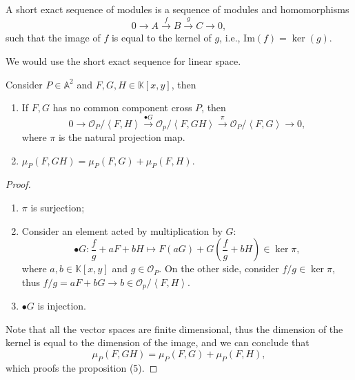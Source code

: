 \documentclass[10pt]{article}
\begin{document}
\begin{definition}
  A short exact sequence of modules is a sequence of modules and homomorphisms
  \begin{equation*}
    0 \rightarrow A \xrightarrow{f} B \xrightarrow{g} C \rightarrow 0,
  \end{equation*}
  such that the image of $ f$ is equal to the kernel of $ g$, i.e., $ \mathrm{Im}(f) = \ker(g)$.
\end{definition}
We would use the short exact sequence for linear space.
\begin{definition}
  Consider $ P \in \mathbb{A}^{2}$ and $ F, G, H \in \mathbb{K}[x,y]$, then
  \begin{enumerate}[(1)]
    \item If $ F, G$ has no common component cross $ P$, then
      \begin{equation*}
        0 \rightarrow \mathcal{O}_{P}/\left< F,H \right> \xrightarrow{\bullet G} \mathcal{O}_{p}/\left< F, GH \right> \xrightarrow{\pi} \mathcal{O}_{P}/\left< F,G \right> \rightarrow 0,
      \end{equation*}
      where $ \pi$ is the natural projection map.
    \item $ \mu_{P}(F, GH) = \mu_{P}(F,G) + \mu_{P}(F,H)$.
  \end{enumerate}
\end{definition}
\begin{proof}
  \begin{enumerate}[(1)]
    \item $ \pi$ is surjection;
    \item Consider an element acted by multiplication by $ G$:
      \begin{equation*}
        \bullet G: \frac{f}{g} + a F + b H \mapsto F(a G) + G\left( \frac{f}{g} + b H \right) \in \ker{\pi},
      \end{equation*}
      where $ a, b \in \mathbb{K}[x,y]$ and $ g \in \mathcal{O}_{P}$. On the other side, consider $ f/g \in \ker{\pi}$, thus $ f / g = a F + b G \rightarrow b \in \mathcal{O}_{p} / \left< F,H \right>$.
    \item $\bullet G$ is injection.
  \end{enumerate}
  Note that all the vector spaces are finite dimensional, thus the dimension of the kernel is equal to the dimension of the image, and we can conclude that
  \begin{equation*}
    \mu_{P}(F, G H) = \mu_{P}(F,G) + \mu_{P}(F,H),
  \end{equation*}
  which proofs the proposition (5).
\end{proof}
\end{document}
